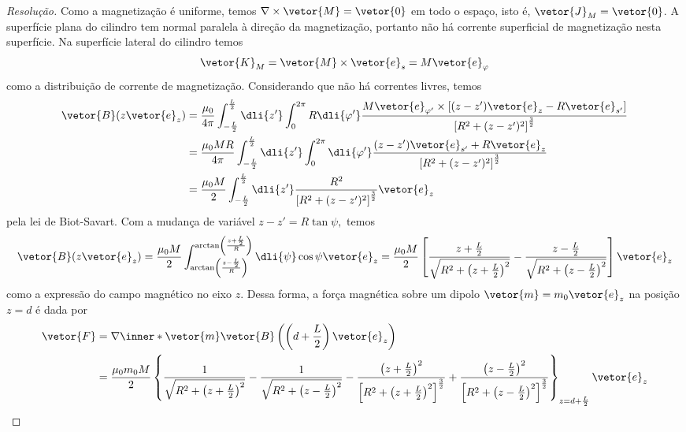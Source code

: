 \begin{proof}[Resolução]
    Como a magnetização é uniforme, temos \(\nabla \times \vetor{M} = \vetor{0}\) em todo o espaço, isto é, \(\vetor{J}_M = \vetor{0}\). A superfície plana do cilindro tem normal paralela à direção da magnetização, portanto não há corrente superficial de magnetização nesta superfície. Na superfície lateral do cilindro temos
    \begin{equation*}
        \vetor{K}_M = \vetor{M} \times \vetor{e}_s = M \vetor{e}_\varphi
    \end{equation*}
    como a distribuição de corrente de magnetização. Considerando que não há correntes livres, temos
    \begin{align*}
        \vetor{B}(z \vetor{e}_z) &= \frac{\mu_0}{4\pi} \int_{-\frac{L}{2}}^{\frac{L}{2}}\dli{z'}\int_{0}^{2\pi} R \dli{\varphi'} \frac{M \vetor{e}_{\varphi'} \times \left[(z - z')\vetor{e}_z- R \vetor{e}_{s'}\right]}{\left[R^2 + (z - z')^2\right]^{\frac32}}\\
                                 &= \frac{\mu_0 M R}{4\pi} \int_{-\frac{L}{2}}^{\frac{L}{2}} \dli{z'} \int_0^{2\pi} \dli{\varphi'} \frac{(z - z')\vetor{e}_{s'} + R \vetor{e}_z}{\left[R^2 + (z - z')^2\right]^{\frac32}}\\
                                 &= \frac{\mu_0 M}{2} \int_{-\frac{L}{2}}^{\frac{L}{2}} \dli{z'}  \frac{R^2}{\left[R^2 + (z - z')^2\right]^{\frac32}}\vetor{e}_z
    \end{align*}
    pela lei de Biot-Savart. Com a mudança de variável \(z - z' = R \tan\psi,\) temos
    \begin{equation*}
        \vetor{B}(z\vetor{e}_z) = \frac{\mu_0 M}{2} \int_{\arctan\left(\frac{z - \frac{L}{2}}{R}\right)}^{\arctan\left(\frac{z + \frac{L}{2}}{R}\right)} \dli{\psi} \cos\psi \vetor{e}_z = \frac{\mu_0 M}{2}\left[\frac{z + \frac{L}{2}}{\sqrt{R^2 + \left(z + \frac{L}{2}\right)^2}} - \frac{z - \frac{L}{2}}{\sqrt{R^2 + \left(z - \frac{L}{2}\right)^2}}\right]\vetor{e}_z
    \end{equation*}
    como a expressão do campo magnético no eixo \(z\). Dessa forma, a força magnética sobre um dipolo \(\vetor{m} = m_0\vetor{e}_z\) na posição \(z = d\) é dada por
    \begin{align*}
        \vetor{F} &= \nabla \inner*{\vetor{m}}{\vetor{B}\left(\left(d+\frac{L}{2}\right)\vetor{e}_z\right)}\\
                  &= \frac{\mu_0m_0 M}{2}\left\{\frac{1}{\sqrt{R^2 + \left(z + \frac{L}{2}\right)^2}} - \frac{1}{\sqrt{R^2 + \left(z - \frac{L}{2}\right)^2}} - \frac{\left(z + \frac{L}{2}\right)^2}{\left[R^2 + \left(z + \frac{L}{2}\right)^2\right]^{\frac32}} + \frac{\left(z - \frac{L}{2}\right)^2}{\left[R^2 + \left(z - \frac{L}{2}\right)^2\right]^{\frac32}}\right\}_{z = d +\frac{L}{2}}\vetor{e}_z\\

\end{align*}
\end{proof}
